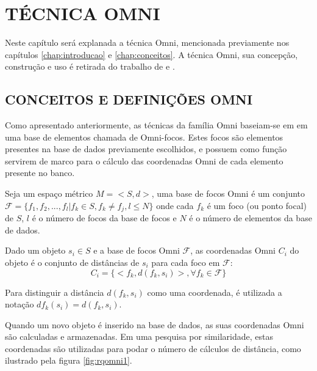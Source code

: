 \chapter{TÉCNICA OMNI}
\label{chap:omni}

Neste capítulo será explanada a técnica Omni, mencionada previamente nos capítulos \ref{chap:introducao} e \ref{chap:conceitos}.
A técnica Omni, sua concepção, construção e uso é retirada do trabalho de \cite{Traina2001} e \cite{Traina2007}.

\section{CONCEITOS E DEFINIÇÕES OMNI}
\label{sec:defomni}
Como apresentado anteriormente, as técnicas da família Omni baseiam-se em em uma base de elementos chamada de 
Omni-focos. Estes focos são elementos presentes na base de dados previamente escolhidos, e possuem como função 
servirem de marco para o cálculo das coordenadas Omni de cada elemento presente no banco.

\begin{mydef}
 \label{def:omnifoco}
 Seja um espaço métrico $M = <S,d>$, uma base de focos Omni é um conjunto 
 $\mathscr{F} = \{f_1, f_2, ..., f_l | f_k \in S, f_k \neq f_j, l \leq N \}$ onde cada $f_k$ é um foco
 (ou ponto focal) de $S$, $l$ é o número de focos da base de focos e $N$ é o número de elementos da base de dados.
\end{mydef}

\begin {mydef}
 \label{def:omnicoord}
 Dado um objeto $s_i \in S$ e a base de focos Omni $\mathscr{F}$, as coordenadas Omni $C_i$ do objeto é o conjunto
 de distâncias de $s_i$ para cada foco em $\mathscr{F}$:
 \begin{equation}
  C_i = \{ <f_k, d(f_k, s_i)>, \forall f_k \in \mathscr{F} \}
 \end{equation}
\end {mydef}

Para distinguir a distância $d(f_k, s_i)$ como uma coordenada, é utilizada a notação $df_k(s_i) = d(f_k, s_i)$.\par
Quando um novo objeto é inserido na base de dados, as suas coordenadas Omni são calculadas e armazenadas. Em uma pesquisa por
similaridade, estas coordenadas são utilizadas para podar o número de cálculos de distância, como ilustrado pela figura \ref{fig:rqomni1}.\par

